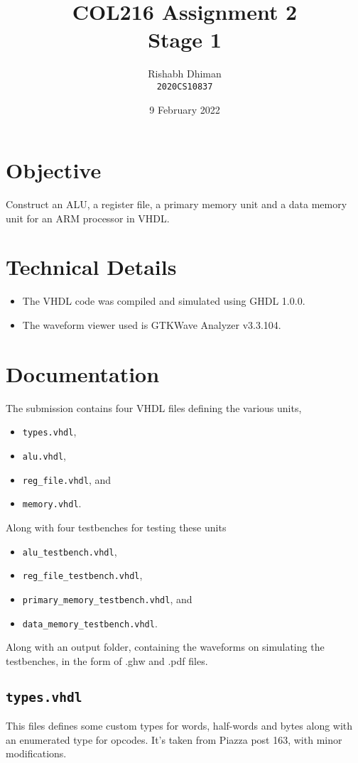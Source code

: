 \documentclass[a4paper]{scrartcl}
\title{COL216 Assignment 2\\{\Large Stage 1}}
\date{9 February 2022}
\author{Rishabh Dhiman\\ \texttt{2020CS10837}}
\theoremstyle{definition}
\renewcommand{\tt}{\texttt}
\begin{document}
\maketitle

\section{Objective}
Construct an ALU, a register file, a primary memory unit and a data memory unit for an ARM processor in VHDL.

\section{Technical Details}
\begin{itemize}
	\item The VHDL code was compiled and simulated using GHDL 1.0.0.
	\item The waveform viewer used is GTKWave Analyzer v3.3.104.
\end{itemize}

\section{Documentation}
The submission contains four VHDL files defining the various units,
\begin{itemize}
	\item \tt{types.vhdl},
	\item \tt{alu.vhdl},
	\item \tt{reg_file.vhdl}, and
	\item \tt{memory.vhdl}.
\end{itemize}
Along with four testbenches for testing these units
\begin{itemize}
	\item \tt{alu_testbench.vhdl},
	\item \tt{reg_file_testbench.vhdl},
	\item \tt{primary_memory_testbench.vhdl}, and
	\item \tt{data_memory_testbench.vhdl}.
\end{itemize}

Along with an output folder, containing the waveforms on simulating the testbenches, in the form of .ghw and .pdf files.

\subsection*{\tt{types.vhdl}}
This files defines some custom types for words, half-words and bytes along with an enumerated type for opcodes. It's taken from Piazza post 163, with minor modifications.
\end{document}
